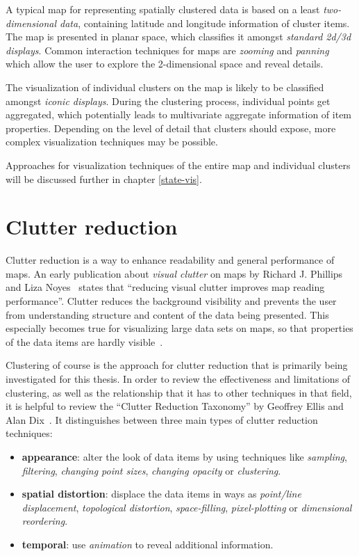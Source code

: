 A typical map for representing spatially clustered data is based on a least \textit{two-dimensional data}, containing latitude and longitude information of cluster items. The map is presented in planar space, which classifies it amongst \textit{standard 2d/3d displays}. Common interaction techniques for maps are \textit{zooming} and \textit{panning} which allow the user to explore the 2-dimensional space and reveal details.

The visualization of individual clusters on the map is likely to be classified amongst \textit{iconic displays}. During the clustering process, individual points get aggregated, which potentially leads to multivariate aggregate information of item properties. Depending on the level of detail that clusters should expose, more complex visualization techniques may be possible. 

Approaches for visualization techniques of the entire map and individual clusters will be discussed further in chapter  \ref{state-vis}.

\section{Clutter reduction}
\label{clutter-reduction}

Clutter reduction is a way to enhance readability and general performance of maps. An early publication about \textit{visual clutter} on maps by Richard J. Phillips and Liza Noyes~\cite{phillips82clutter} states that ``reducing visual clutter improves map reading performance''. Clutter reduces the background visibility and prevents the user from understanding structure and content of the data being presented. This especially becomes true for visualizing large data sets on maps, so that properties of the data items are hardly visible~\cite{harvey2008primer, Delort10vis}.

Clustering of course is the approach for clutter reduction that is primarily being investigated for this thesis. In order to review the effectiveness and limitations of clustering, as well as the relationship that it has to other techniques in that field, it is helpful to review the ``Clutter Reduction Taxonomy'' by Geoffrey Ellis and Alan Dix~\cite{ellis08clutter}. It distinguishes between three main types of clutter reduction techniques:

\begin{itemize}

\item \textbf{appearance}: alter the look of data items by using techniques like \textit{sampling}, \textit{filtering}, \textit{changing point sizes}, \textit{changing opacity} or \textit{clustering}.

\item \textbf{spatial distortion}: displace the data items in ways as \textit{point/line displacement}, \textit{topological distortion}, \textit{space-filling}, \textit{pixel-plotting} or \textit{dimensional reordering}.

\item \textbf{temporal}: use \textit{animation} to reveal additional information.

\end{itemize}

